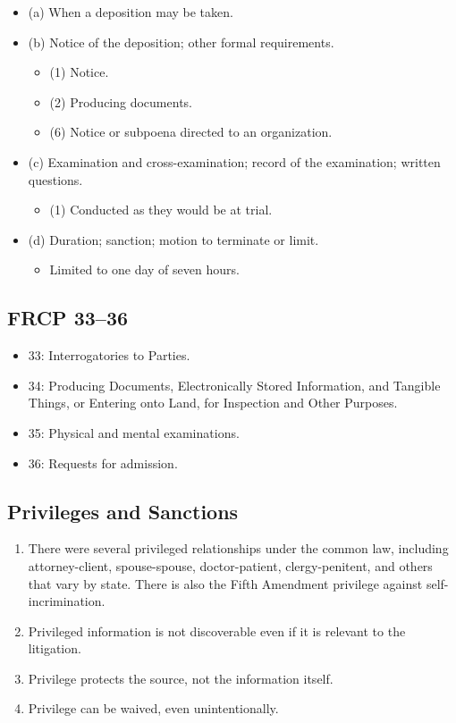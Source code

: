 \begin{itemize}
    \item (a) When a deposition may be taken.
    \item (b) Notice of the deposition; other formal requirements.
    \begin{itemize}
        \item (1) Notice.
        \item (2) Producing documents.
        \item (6) Notice or subpoena directed to an organization.
    \end{itemize}
    \item (c) Examination and cross-examination; record of the examination; 
    written questions.
    \begin{itemize}
        \item (1) Conducted as they would be at trial.
    \end{itemize}
    \item (d) Duration; sanction; motion to terminate or limit.
    \begin{itemize}
        \item Limited to one day of seven hours.
    \end{itemize}
\end{itemize}

\subsection{FRCP 33--36}

\begin{itemize}
    \item 33: Interrogatories to Parties.
    \item 34: Producing Documents, Electronically Stored Information, and 
    Tangible Things, or Entering onto Land, for Inspection and Other Purposes.
    \item 35: Physical and mental examinations.
    \item 36: Requests for admission.
\end{itemize}

\subsection{Privileges and Sanctions}

\begin{enumerate}
    \item There were several privileged relationships under the common law, 
    including attorney-client, spouse-spouse, doctor-patient, clergy-penitent, 
    and others that vary by state. There is also the Fifth Amendment privilege 
    against self-incrimination.
    \item Privileged information is not discoverable even if it is relevant to 
    the litigation.
    \item Privilege protects the source, not the information itself.
    \item Privilege can be waived, even unintentionally.
\end{enumerate}

